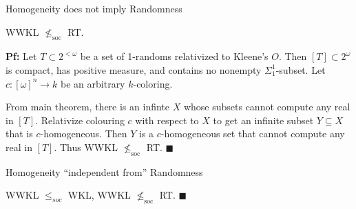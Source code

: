 \begin{frame}{Homogeneity does not imply Randomness}
  \begin{theorem}
    WWKL $\nleq_{\text{soc}}$ RT.
  \end{theorem}

  \vspace{1em}
  \textbf{Pf:} Let $T\subset2^{<\omega}$ be a set of 1-randoms relativized
  to Kleene's $O$. Then $[T]\subset 2^\omega$ is compact, has positive
  measure, and contains no nonempty $\Sigma_1^1$-subset. Let
  $c:[\omega]^n\rightarrow k$ be an arbitrary $k$-coloring.
  
  \vspace{2em}
  From main theorem, there is an infinte $X$ whose subsets cannot
  compute any real in $[T]$. Relativize colouring $c$ with respect to $X$
  to get an infinite subset $Y\subseteq X$ that is $c$-homogeneous. Then
  $Y$ is a $c$-homogeneous set that cannot compute any real in $[T]$. Thus
  WWKL $\nleq_{\text{soc}}$ RT.  $\blacksquare$
\end{frame}

\begin{frame}{Homogeneity ``independent from'' Randomness}
  \begin{coro}
    WWKL $\leq_{soc}$ WKL, WWKL $\nleq_{\text{soc}}$ RT. $\blacksquare$
  \end{coro}

  \vspace{2em}
  \begin{center}
  \end{center}
\end{frame}
